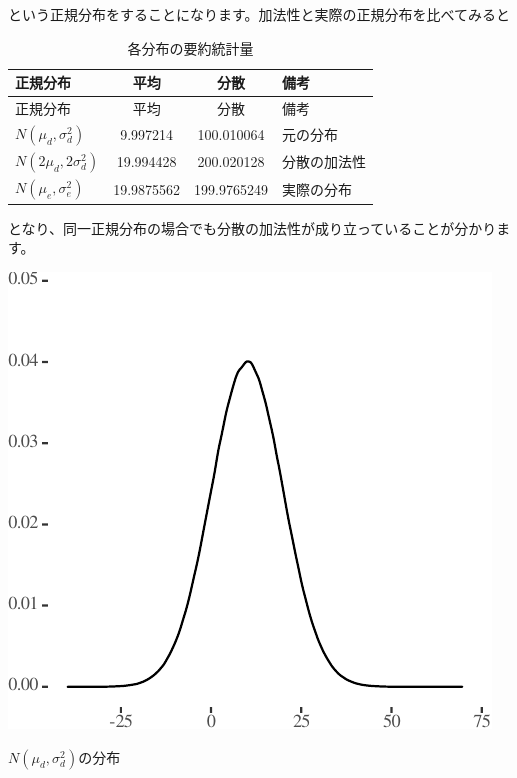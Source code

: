 \documentclass[]{tufte-handout}
\begin{document}
という正規分布をすることになります。加法性と実際の正規分布を比べてみると

\begin{longtable}[]{@{}lccl@{}}
\caption{各分布の要約統計量}\tabularnewline
\toprule
正規分布 & 平均 & 分散 & 備考 \\
\midrule
\endfirsthead
\toprule
正規分布 & 平均 & 分散 & 備考 \\
\midrule
\endhead
\(N(\mu_d, \sigma^2_d)\) & 9.997214 & 100.010064 & 元の分布 \\
\(N(2\mu_d, 2\sigma^2_d)\) & 19.994428 & 200.020128 & 分散の加法性 \\
\(N(\mu_e, \sigma^2_e)\) & 19.9875562 & 199.9765249 & 実際の分布 \\
\bottomrule
\end{longtable}

となり、同一正規分布の場合でも分散の加法性が成り立っていることが分かります。

\begin{marginfigure}

{\centering \includegraphics{AdditivityOfVariance_files/figure-latex/unnamed-chunk-8-1} 

}

\caption[$N(\mu_d, \sigma^2_d)$の分布]{$N(\mu_d, \sigma^2_d)$の分布}\label{fig:unnamed-chunk-8}
\end{marginfigure}
\end{document}
